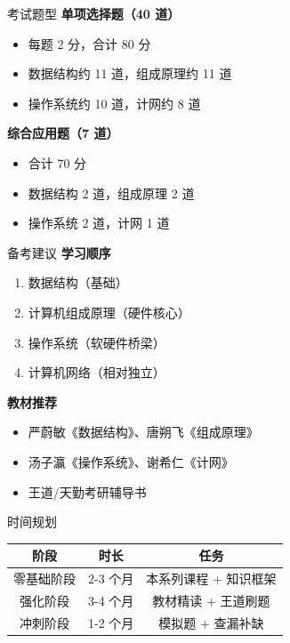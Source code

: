 \documentclass[10pt, aspectratio=169]{beamer}
\begin{document}
\begin{frame}{考试题型}
    \textbf{单项选择题（40 道）}
    \begin{itemize}
        \item 每题 2 分，合计 80 分
        \item 数据结构约 11 道，组成原理约 11 道
        \item 操作系统约 10 道，计网约 8 道
    \end{itemize}
    \vspace{0.3em}
    \textbf{综合应用题（7 道）}
    \begin{itemize}
        \item 合计 70 分
        \item 数据结构 2 道，组成原理 2 道
        \item 操作系统 2 道，计网 1 道
    \end{itemize}
\end{frame}

\begin{frame}{备考建议}
    \textbf{学习顺序}
    \begin{enumerate}
        \item 数据结构（基础）
        \item 计算机组成原理（硬件核心）
        \item 操作系统（软硬件桥梁）
        \item 计算机网络（相对独立）
    \end{enumerate}
    \vspace{0.5em}
    \textbf{教材推荐}
    \begin{itemize}
        \item 严蔚敏《数据结构》、唐朔飞《组成原理》
        \item 汤子瀛《操作系统》、谢希仁《计网》
        \item 王道/天勤考研辅导书
    \end{itemize}
\end{frame}

\begin{frame}{时间规划}
    \begin{tabular}{|c|c|c|}
        \hline
        \textbf{阶段} & \textbf{时长} & \textbf{任务} \\ \hline
        零基础阶段 & 2-3 个月 & 本系列课程 + 知识框架 \\ \hline
        强化阶段 & 3-4 个月 & 教材精读 + 王道刷题 \\ \hline
        冲刺阶段 & 1-2 个月 & 模拟题 + 查漏补缺 \\ \hline
    \end{tabular}
\end{frame}
\end{document}
